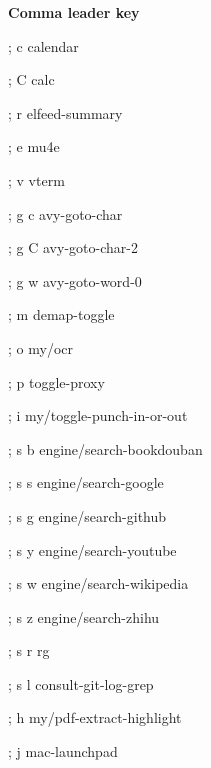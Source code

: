 \documentclass[10pt]{article}
\renewcommand\section[1]{\bigskip\par\textbf{\color{heading}\large#1}\smallskip}
\begin{document}
\begin{multicols}{4}
  \section{Comma leader key}
  \begin{keylist}
    \item[; c] calendar
    \item[; C] calc
    \item[; r] elfeed-summary
    \item[; e] mu4e
    \item[; v] vterm
    \item[; g c] avy-goto-char
    \item[; g C] avy-goto-char-2
    \item[; g w] avy-goto-word-0
    \item[; m] demap-toggle
    \item[; o] my/ocr
    \item[; p] toggle-proxy
    \item[; i] my/toggle-punch-in-or-out
    \item[; s b] engine/search-bookdouban
    \item[; s s] engine/search-google
    \item[; s g] engine/search-github
    \item[; s y] engine/search-youtube
    \item[; s w] engine/search-wikipedia
    \item[; s z] engine/search-zhihu
    \item[; s r] rg
    \item[; s l] consult-git-log-grep
    \item[; h] my/pdf-extract-highlight
    \item[; j] mac-launchpad
  \end{keylist}

\end{multicols}
\end{document}

